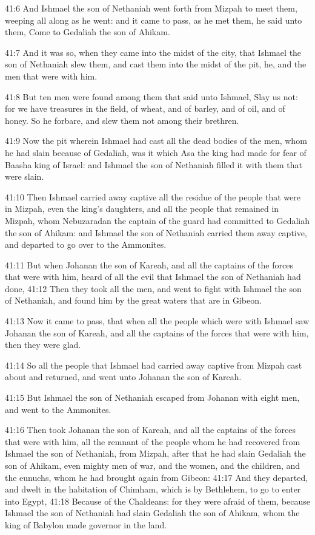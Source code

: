 41:6 And Ishmael the son of Nethaniah went forth from Mizpah to meet
them, weeping all along as he went: and it came to pass, as he met
them, he said unto them, Come to Gedaliah the son of Ahikam.

41:7 And it was so, when they came into the midst of the city, that
Ishmael the son of Nethaniah slew them, and cast them into the midst
of the pit, he, and the men that were with him.

41:8 But ten men were found among them that said unto Ishmael, Slay us
not: for we have treasures in the field, of wheat, and of barley, and
of oil, and of honey. So he forbare, and slew them not among their
brethren.

41:9 Now the pit wherein Ishmael had cast all the dead bodies of the
men, whom he had slain because of Gedaliah, was it which Asa the king
had made for fear of Baasha king of Israel: and Ishmael the son of
Nethaniah filled it with them that were slain.

41:10 Then Ishmael carried away captive all the residue of the people
that were in Mizpah, even the king's daughters, and all the people
that remained in Mizpah, whom Nebuzaradan the captain of the guard had
committed to Gedaliah the son of Ahikam: and Ishmael the son of
Nethaniah carried them away captive, and departed to go over to the
Ammonites.

41:11 But when Johanan the son of Kareah, and all the captains of the
forces that were with him, heard of all the evil that Ishmael the son
of Nethaniah had done, 41:12 Then they took all the men, and went to
fight with Ishmael the son of Nethaniah, and found him by the great
waters that are in Gibeon.

41:13 Now it came to pass, that when all the people which were with
Ishmael saw Johanan the son of Kareah, and all the captains of the
forces that were with him, then they were glad.

41:14 So all the people that Ishmael had carried away captive from
Mizpah cast about and returned, and went unto Johanan the son of
Kareah.

41:15 But Ishmael the son of Nethaniah escaped from Johanan with eight
men, and went to the Ammonites.

41:16 Then took Johanan the son of Kareah, and all the captains of the
forces that were with him, all the remnant of the people whom he had
recovered from Ishmael the son of Nethaniah, from Mizpah, after that
he had slain Gedaliah the son of Ahikam, even mighty men of war, and
the women, and the children, and the eunuchs, whom he had brought
again from Gibeon: 41:17 And they departed, and dwelt in the
habitation of Chimham, which is by Bethlehem, to go to enter into
Egypt, 41:18 Because of the Chaldeans: for they were afraid of them,
because Ishmael the son of Nethaniah had slain Gedaliah the son of
Ahikam, whom the king of Babylon made governor in the land.

